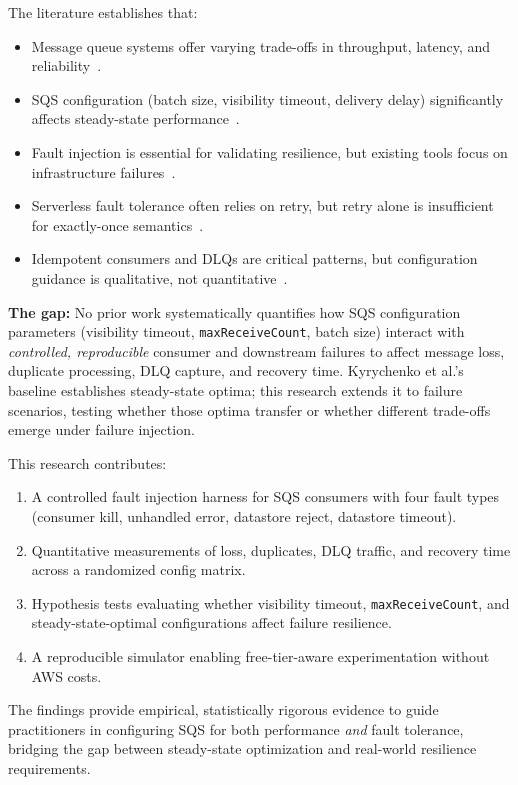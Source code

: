 The literature establishes that:
\begin{itemize}
    \item Message queue systems offer varying trade-offs in throughput, latency, and reliability~\citep{DiasDeAssuncao2020MQComparison, Maharjan2023Benchmarking}.
    \item SQS configuration (batch size, visibility timeout, delivery delay) significantly affects steady-state performance~\citep{Kyrychenko2025}.
    \item Fault injection is essential for validating resilience, but existing tools focus on infrastructure failures~\citep{Gao2023CrashFuzz, Wu2024Legolas}.
    \item Serverless fault tolerance often relies on retry, but retry alone is insufficient for exactly-once semantics~\citep{Qi2023Halfmoon, Wang2021KafkaExactlyOnce}.
    \item Idempotent consumers and DLQs are critical patterns, but configuration guidance is qualitative, not quantitative~\citep{Yadav2024Idempotent, AWSResilience2023}.
\end{itemize}

\textbf{The gap:} No prior work systematically quantifies how SQS configuration parameters (visibility timeout, \texttt{maxReceiveCount}, batch size) interact with \emph{controlled, reproducible} consumer and downstream failures to affect message loss, duplicate processing, DLQ capture, and recovery time. Kyrychenko et al.'s baseline establishes steady-state optima; this research extends it to failure scenarios, testing whether those optima transfer or whether different trade-offs emerge under failure injection.

This research contributes:
\begin{enumerate}
    \item A controlled fault injection harness for SQS consumers with four fault types (consumer kill, unhandled error, datastore reject, datastore timeout).
    \item Quantitative measurements of loss, duplicates, DLQ traffic, and recovery time across a randomized config matrix.
    \item Hypothesis tests evaluating whether visibility timeout, \texttt{maxReceiveCount}, and steady-state-optimal configurations affect failure resilience.
    \item A reproducible simulator enabling free-tier-aware experimentation without AWS costs.
\end{enumerate}

The findings provide empirical, statistically rigorous evidence to guide practitioners in configuring SQS for both performance \emph{and} fault tolerance, bridging the gap between steady-state optimization and real-world resilience requirements.

